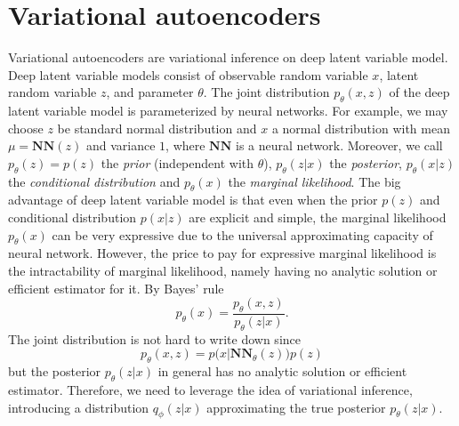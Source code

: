\documentclass[12pt]{report}
\theoremstyle{definition}
\theoremstyle{remark}
\begin{document}
\section{Variational autoencoders}
Variational autoencoders are variational inference on deep latent variable model. Deep latent variable models consist of observable random variable $x$, latent random variable $z$, and parameter $\theta$. The joint distribution $p_{\theta}(x,z)$ of the deep latent variable model is parameterized by neural networks. For example, we may choose $z$ be standard normal distribution and $x$ a normal distribution with mean $\mu = \mathbf{NN}(z)$ and variance $1$, where $\mathbf{NN}$ is a neural network. Moreover, we call $p_{\theta}(z) = p(z)$ the \textit{prior} (independent with $\theta$), $p_{\theta}(z|x)$ the \textit{posterior}, $p_{\theta}(x|z)$ the \textit{conditional distribution} and $p_{\theta}(x)$ the \textit{marginal likelihood}. The big advantage of deep latent variable model is that even when the prior $p(z)$ and conditional distribution $p(x|z)$ are explicit and simple, the marginal likelihood $p_{\theta}(x)$ can be very expressive due to the universal approximating capacity of neural network. However, the price to pay for expressive marginal likelihood is the intractability of marginal likelihood, namely having no analytic solution or efficient estimator for it. By Bayes' rule 
$$p_{\theta}(x) = \frac{p_{\theta}(x,z)}{p_{\theta}(z|x)}.$$
The joint distribution is not hard to write down since 
$$p_{\theta}(x,z) = p\big(x|\mathbf{NN}_{\theta}(z)\big) p(z)$$
but the posterior $p_{\theta}(z|x)$ in general has no analytic solution or efficient estimator. Therefore, we need to leverage the idea of variational inference, introducing a distribution $q_{\phi}(z|x)$ approximating the true posterior $p_{\theta}(z|x)$.
\end{document}
